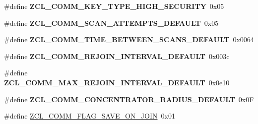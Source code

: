 \begin{DoxyCompactItemize}
\item 
\hypertarget{group__zcl__commissioning_ga46d75e146e6b77f3c568e86f8fb81b72}{\#define {\bfseries Z\-C\-L\-\_\-\-C\-O\-M\-M\-\_\-\-K\-E\-Y\-\_\-\-T\-Y\-P\-E\-\_\-\-H\-I\-G\-H\-\_\-\-S\-E\-C\-U\-R\-I\-T\-Y}~0x05}\label{group__zcl__commissioning_ga46d75e146e6b77f3c568e86f8fb81b72}

\item 
\hypertarget{group__zcl__commissioning_ga59f8071f92e78712954832b5d5d73cb2}{\#define {\bfseries Z\-C\-L\-\_\-\-C\-O\-M\-M\-\_\-\-S\-C\-A\-N\-\_\-\-A\-T\-T\-E\-M\-P\-T\-S\-\_\-\-D\-E\-F\-A\-U\-L\-T}~0x05}\label{group__zcl__commissioning_ga59f8071f92e78712954832b5d5d73cb2}

\item 
\hypertarget{group__zcl__commissioning_ga0e146d73ad21faec4d9338470a0267d6}{\#define {\bfseries Z\-C\-L\-\_\-\-C\-O\-M\-M\-\_\-\-T\-I\-M\-E\-\_\-\-B\-E\-T\-W\-E\-E\-N\-\_\-\-S\-C\-A\-N\-S\-\_\-\-D\-E\-F\-A\-U\-L\-T}~0x0064}\label{group__zcl__commissioning_ga0e146d73ad21faec4d9338470a0267d6}

\item 
\hypertarget{group__zcl__commissioning_gac94f1c5753e8b1e71475cfcda4011150}{\#define {\bfseries Z\-C\-L\-\_\-\-C\-O\-M\-M\-\_\-\-R\-E\-J\-O\-I\-N\-\_\-\-I\-N\-T\-E\-R\-V\-A\-L\-\_\-\-D\-E\-F\-A\-U\-L\-T}~0x003c}\label{group__zcl__commissioning_gac94f1c5753e8b1e71475cfcda4011150}

\item 
\hypertarget{group__zcl__commissioning_ga9c45d709d61ef3f0dba6f9f139d9bc16}{\#define {\bfseries Z\-C\-L\-\_\-\-C\-O\-M\-M\-\_\-\-M\-A\-X\-\_\-\-R\-E\-J\-O\-I\-N\-\_\-\-I\-N\-T\-E\-R\-V\-A\-L\-\_\-\-D\-E\-F\-A\-U\-L\-T}~0x0e10}\label{group__zcl__commissioning_ga9c45d709d61ef3f0dba6f9f139d9bc16}

\item 
\hypertarget{group__zcl__commissioning_ga4f551f972a8e6ec65cf90a888fe80758}{\#define {\bfseries Z\-C\-L\-\_\-\-C\-O\-M\-M\-\_\-\-C\-O\-N\-C\-E\-N\-T\-R\-A\-T\-O\-R\-\_\-\-R\-A\-D\-I\-U\-S\-\_\-\-D\-E\-F\-A\-U\-L\-T}~0x0\-F}\label{group__zcl__commissioning_ga4f551f972a8e6ec65cf90a888fe80758}

\item 
\hypertarget{group__zcl__commissioning_ga83365bb85e2b264c1741d75e8522a754}{\#define \hyperlink{group__zcl__commissioning_ga83365bb85e2b264c1741d75e8522a754}{Z\-C\-L\-\_\-\-C\-O\-M\-M\-\_\-\-F\-L\-A\-G\-\_\-\-S\-A\-V\-E\-\_\-\-O\-N\-\_\-\-J\-O\-I\-N}~0x01}\label{group__zcl__commissioning_ga83365bb85e2b264c1741d75e8522a754}


\end{DoxyCompactItemize}
